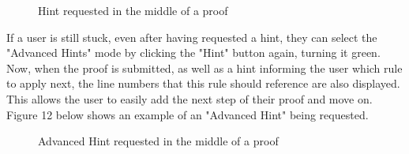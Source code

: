 \begin{figure}[!ht]
	\centering
	\caption{Hint requested in the middle of a proof}
\end{figure}

If a user is still stuck, even after having requested a hint, they can select the "Advanced Hints" mode by clicking the "Hint" button again, turning it green. Now, when the proof is submitted, as well as a hint informing the user which rule to apply next, the line numbers that this rule should reference are also displayed. This allows the user to easily add the next step of their proof and move on. Figure 12 below shows an example of an "Advanced Hint" being requested.

\begin{figure}[!ht]
	\centering
	\caption{Advanced Hint requested in the middle of a proof}
\end{figure}

